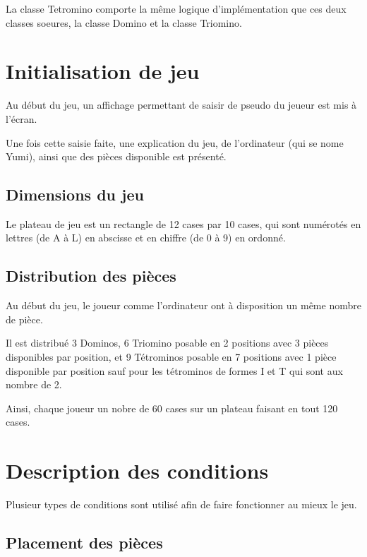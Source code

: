 \documentclass[a4paper, titlepage, french]{report}
\begin{document}
La classe Tetromino comporte la même logique d'implémentation que ces deux classes soeures, la classe Domino
et la classe Triomino.

\bigskip

\chapter{Initialisation de jeu}

Au début du jeu, un affichage permettant de saisir de pseudo du jeueur est mis à l'écran.

Une fois cette saisie faite, une explication du jeu, de l'ordinateur (qui se nome Yumi), ainsi que des pièces disponible est présenté.



\section{Dimensions du jeu}

Le plateau de jeu est un rectangle de 12 cases par 10 cases, qui sont numérotés en lettres (de A à L) en abscisse et en chiffre (de 0 à 9) en ordonné.

\section{Distribution des pièces}

Au début du jeu, le joueur comme l'ordinateur ont à disposition un même nombre de pièce.
\bigskip

Il est distribué 3 Dominos, 6 Triomino posable en 2 positions avec 3 pièces disponibles par position, et 9 Tétrominos posable en 7 positions avec 1 pièce disponible par position sauf pour les tétrominos de formes I et T qui sont aux nombre de 2.

Ainsi, chaque joueur un nobre de 60 cases sur un plateau faisant en tout 120 cases.

\chapter{Description des conditions}

Plusieur types de conditions sont utilisé afin de faire fonctionner au mieux le jeu.

\section{Placement des pièces}
\end{document}
